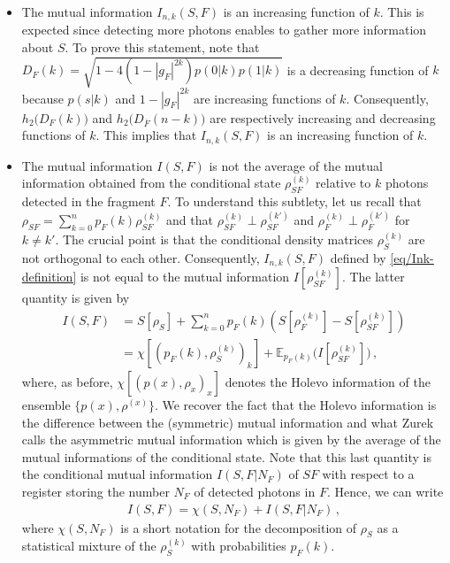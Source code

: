 \begin{itemize}

	\item The mutual information $I_{n,k}(S,F)$ is an increasing function of $k$. This is
expected since detecting more photons enables to gather more information
about $S$. To prove this statement, note that
$D_{F}(k) = \sqrt{1-4(1-|g_F|^{2k})p(0|k)p(1|k)}$
is a decreasing function of $k$ because $p(s|k)$ and $1-|g_F|^{2k}$ are increasing
functions of $k$. Consequently, $h_2\big(D_{F}(k)\big)$ and 
$h_2\big( D_{\overline{F}}(n-k) \big)$  are respectively
increasing and decreasing functions of $k$. This implies
		that  $I_{n,k}(S,F)$ is an increasing function of $k$.

\item The mutual information $I(S,F)$ is not the average of the
mutual information obtained from the conditional state 
$\rho^{(k)}_{SF}$ relative to $k$ photons detected in the fragment
$F$. To understand this subtlety, let us recall that $\rho_{SF} = 
\sum_{k=0}^n p_F(k) \rho^{(k)}_{SF}$ and
that $\rho^{(k)}_{SF} \perp \rho^{(k')}_{SF}$ and 
$\rho^{(k)}_F \perp \rho^{(k')}_{F}$ for $k \ne k'$. The crucial point
is that  the
conditional density matrices $\rho^{(k)}_{S}$ are not orthogonal to
		each other. Consequently, $I_{n,k}(S,F)$ defined by
		\cref{eq/Ink-definition} is not equal to
		the mutual information $I[\rho^{(k)}_{SF}]$. The latter quantity
is given by
%
\begin{align}
I(S,F) &= S[\rho_S] + \sum_{k=0}^n p_F(k) 
	(S[\rho^{(k)}_F] - S[\rho^{(k)}_{SF}]) 
\nonumber \\
	&= \chi\left[\left(p_F(k),\rho^{(k)}_{S}\right)_k\right] + 
\mathbb{E}_{p_F(k)}\big( I[\rho^{(k)}_{SF}] \big)
\,,
\label{eq/mutual-Holevo-decomp}
\end{align}
where, as before, 
$\chi\left[\left(p(x),\rho_{x}\right)_x\right]$ 
denotes the Holevo
information of the ensemble $\lbrace p(x), \rho^{(x)}\rbrace$. 
We recover the fact that the Holevo information is the difference
between the (symmetric) mutual information and what Zurek calls the asymmetric
mutual information
which is 
given by the average of the mutual informations of the conditional
state. Note that this last quantity 
is the conditional mutual information $I(S,F|N_F)$ of $SF$ with respect to
a register storing the number $N_F$ of detected photons in $F$.
Hence, we can write
%
\begin{align}
I(S,F) = \chi(S, N_F) + I(S,F|N_F)
\,,
\end{align}
		where $\chi(S,N_F)$ is a short notation for the decomposition of
		$\rho_S$ as a statistical mixture of the $\rho_S^{(k)}$ with
		probabilities $p_F(k)$.
\end{itemize}

